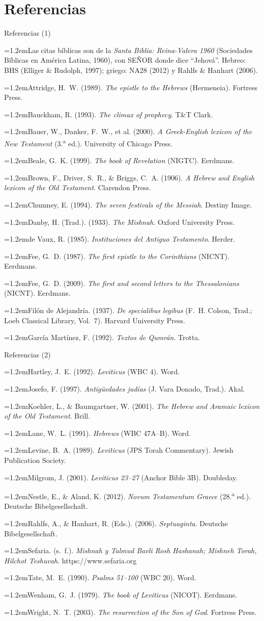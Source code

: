 \documentclass[hyperref={bookmarks=false},aspectratio=169]{beamer}
\newcommand{\SENOR}{S{\fontsize{0.78em}{1em}\selectfont EÑOR}}
\newcommand{\refapa}[1]{\par{\RaggedRight\hangindent=1.2em\hangafter=1\noindent #1\par}\vspace{3pt}}
\begin{document}
\section{Referencias}

\begin{frame}{Referencias (1)}
\fontsize{6}{7.2}\selectfont
\refapa{Las citas bíblicas son de la \emph{Santa Biblia: Reina-Valera 1960} (Sociedades Bíblicas en América Latina, 1960), con \SENOR{} donde dice ``Jehová''. Hebreo: BHS (Elliger \& Rudolph, 1997); griego: NA28 (2012) y Rahlfs \& Hanhart (2006).}
\refapa{Attridge, H.~W. (1989). \emph{The epistle to the Hebrews} (Hermeneia). Fortress Press.}
\refapa{Bauckham, R. (1993). \emph{The climax of prophecy}. T\&T Clark.}
\refapa{Bauer, W., Danker, F.~W., et al. (2000). \emph{A Greek-English lexicon of the New Testament} (3.\textsuperscript{a} ed.). University of Chicago Press.}
\refapa{Beale, G.~K. (1999). \emph{The book of Revelation} (NIGTC). Eerdmans.}
\refapa{Brown, F., Driver, S.~R., \& Briggs, C.~A. (1906). \emph{A Hebrew and English lexicon of the Old Testament}. Clarendon Press.}
\refapa{Chumney, E. (1994). \emph{The seven festivals of the Messiah}. Destiny Image.}
\refapa{Danby, H. (Trad.). (1933). \emph{The Mishnah}. Oxford University Press.}
\refapa{de Vaux, R. (1985). \emph{Instituciones del Antiguo Testamento}. Herder.}
\refapa{Fee, G.~D. (1987). \emph{The first epistle to the Corinthians} (NICNT). Eerdmans.}
\refapa{Fee, G.~D. (2009). \emph{The first and second letters to the Thessalonians} (NICNT). Eerdmans.}
\refapa{Filón de Alejandría. (1937). \emph{De specialibus legibus} (F.~H. Colson, Trad.; Loeb Classical Library, Vol.~7). Harvard University Press.}
\refapa{García Martínez, F. (1992). \emph{Textos de Qumrán}. Trotta.}
\end{frame}

\begin{frame}{Referencias (2)}
\fontsize{6}{7.2}\selectfont
\refapa{Hartley, J.~E. (1992). \emph{Leviticus} (WBC 4). Word.}
\refapa{Josefo, F. (1997). \emph{Antigüedades judías} (J. Vara Donado, Trad.). Akal.}
\refapa{Koehler, L., \& Baumgartner, W. (2001). \emph{The Hebrew and Aramaic lexicon of the Old Testament}. Brill.}
\refapa{Lane, W.~L. (1991). \emph{Hebrews} (WBC 47A--B). Word.}
\refapa{Levine, B.~A. (1989). \emph{Leviticus} (JPS Torah Commentary). Jewish Publication Society.}
\refapa{Milgrom, J. (2001). \emph{Leviticus 23--27} (Anchor Bible 3B). Doubleday.}
\refapa{Nestle, E., \& Aland, K. (2012). \emph{Novum Testamentum Graece} (28.\textsuperscript{a} ed.). Deutsche Bibelgesellschaft.}
\refapa{Rahlfs, A., \& Hanhart, R. (Eds.). (2006). \emph{Septuaginta}. Deutsche Bibelgesellschaft.}
\refapa{Sefaria. (s.~f.). \emph{Mishnah y Talmud Bavli Rosh Hashanah; Mishneh Torah, Hilchot Teshuvah}. https://www.sefaria.org}
\refapa{Tate, M.~E. (1990). \emph{Psalms 51--100} (WBC 20). Word.}
\refapa{Wenham, G.~J. (1979). \emph{The book of Leviticus} (NICOT). Eerdmans.}
\refapa{Wright, N.~T. (2003). \emph{The resurrection of the Son of God}. Fortress Press.}
\end{frame}
\end{document}
